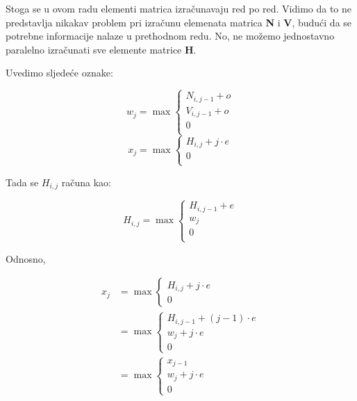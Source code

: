 \documentclass[times, utf8, zavrsni, numeric]{fer}
\begin{document}
Stoga se u ovom radu elementi matrica izračunavaju red po red. Vidimo da to ne predstavlja nikakav problem pri izračunu elemenata matrica \textbf{N} i \textbf{V}, budući da se potrebne informacije nalaze u prethodnom redu. No, ne možemo jednostavno paralelno izračunati sve elemente matrice \textbf{H}.

Uvedimo sljedeće oznake:
\begin{center}
\begin{equation}
w_{j} = \max \left\{
	\begin{array}{lr}
		N_{i, j - 1} + o\\
		V_{i, j - 1} + o\\
		0\\
		\end{array}
\right.
\end{equation}
\begin{equation}
x_{j} = \max \left\{
	\begin{array}{lr}
	H_{i, j} + j\cdot e\\
	0\\
	\end{array}
\right.
\end{equation}
\end{center}
Tada se $H_{i, j}$ računa kao:
\begin{center}
\begin{equation}
H_{i, j} = \max \left\{
	\begin{array}{lr}
	H_{i, j - 1} + e\\
	w_{j}\\
	0\\
	\end{array}
\right.
\end{equation}
\end{center}
Odnosno,
\begin{center}
\begin{align*}
x_{j} &= \max \left\{
		\begin{array}{lr}
			H_{i, j} + j\cdot e \\
			0
		\end{array}
	\right. \\
	&= \max \left\{
		\begin{array}{lr}
		H_{i, j - 1} + (j - 1)\cdot e\\
		w_{j} + j\cdot e \\
		0
		\end{array}
	\right. \\
	&= \max \left\{
			\begin{array}{lr}
			x_{j - 1}\\
			w_{j} + j\cdot e \\
			0
			\end{array}
		\right.\\
\end{align*}
\end{center}
\end{document}
